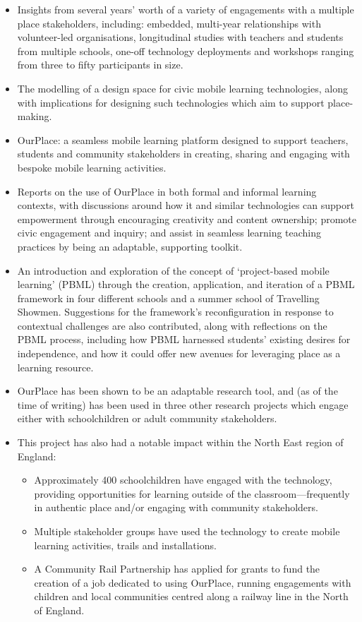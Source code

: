 \begin{itemize}
    \item Insights from several years' worth of a variety of engagements with a multiple place stakeholders, including: embedded, multi-year relationships with volunteer-led organisations, longitudinal studies with teachers and students from multiple schools, one-off technology deployments and workshops ranging from three to fifty participants in size.
    \item The modelling of a design space for civic mobile learning technologies, along with implications for designing such technologies which aim to support place-making.
    \item OurPlace: a seamless mobile learning platform designed to support teachers, students and community stakeholders in creating, sharing and engaging with bespoke mobile learning activities.
    \item Reports on the use of OurPlace in both formal and informal learning contexts, with discussions around how it and similar technologies can support empowerment through encouraging creativity and content ownership; promote civic engagement and inquiry; and assist in seamless learning teaching practices by being an adaptable, supporting toolkit.
    \item An introduction and exploration of the concept of `project-based mobile learning' (PBML) through the creation, application, and iteration of a PBML framework in four different schools and a summer school of Travelling Showmen. Suggestions for the framework's reconfiguration in response to contextual challenges are also contributed, along with reflections on the PBML process, including how PBML harnessed students’ existing desires for independence, and how it could offer new avenues for leveraging place as a learning resource.
    \item OurPlace has been shown to be an adaptable research tool, and (as of the time of writing) has been used in three other research projects which engage either with schoolchildren or adult community stakeholders.
    \item This project has also had a notable impact within the North East region of England:
    \begin{itemize}
    \item Approximately 400 schoolchildren have engaged with the technology, providing opportunities for learning outside of the classroom---frequently in authentic place and/or engaging with community stakeholders.
    \item Multiple stakeholder groups have used the technology to create mobile learning activities, trails and installations.
    \item A Community Rail Partnership has applied for grants to fund the creation of a job dedicated to using OurPlace, running engagements with children and local communities centred along a railway line in the North of England.
    \end{itemize}
\end{itemize}

